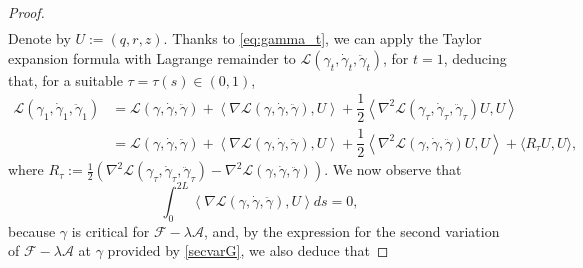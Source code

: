 \documentclass[11pt]{amsart}
\newcommand{\A}{\mathcal A}
\newcommand{\F}{\mathcal F}
\newcommand{\Lag}{\mathscr{L}}
\theoremstyle{definition}
\theoremstyle{remark}
\numberwithin{equation}{section}
\begin{document}
\begin{proof}
\begin{equation}
\begin{split}
\end{split}
\end{equation}
Denote by $U := (q,r,z)$. Thanks to \eqref{eq:gamma_t}, we can apply the Taylor expansion formula with Lagrange remainder to $\Lag(\gamma_t , \dot \gamma_t , \ddot \gamma_t)$, for $t=1$, deducing that, for a suitable $\tau = \tau(s) \in (0,1)$,
\begin{equation} \label{eq:Lag_t=1}
\begin{split}
\Lag(\gamma_1, \dot \gamma_1 , \ddot \gamma_1) & = \Lag(\gamma, \dot \gamma , \ddot \gamma) + \left \langle \nabla \Lag(\gamma, \dot \gamma , \ddot \gamma), U \right \rangle + \dfrac{1}{2} \left \langle \nabla^2 \Lag(\gamma_{\tau}, \dot \gamma_{\tau}, \ddot \gamma_{\tau}) U, U \right \rangle \\
& = \Lag(\gamma, \dot \gamma , \ddot \gamma) + \left \langle \nabla \Lag(\gamma, \dot \gamma , \ddot \gamma), U \right \rangle + \dfrac{1}{2} \left \langle \nabla^2 \Lag(\gamma, \dot \gamma, \ddot \gamma) U, U \right \rangle + \langle R_{\tau} U, U \rangle , %
\end{split}
\end{equation}
where $R_{\tau} := \frac{1}{2} \left( \nabla^2 \Lag(\gamma_{\tau}, \dot \gamma_{\tau}, \ddot \gamma_{\tau}) - \nabla^2 \Lag(\gamma, \dot \gamma, \ddot \gamma) \right)$.
We now observe that
\begin{equation} \label{eq:first_var_Lag}
\int_0^{2L} \left \langle \nabla \Lag(\gamma, \dot \gamma , \ddot \gamma), U \right \rangle ds = 0 ,
\end{equation}
because $\gamma$ is critical for $\mathcal F-\lambda  \A $, and, by the expression for the second variation of $\F-\lambda\A$ at $\gamma$ provided by \eqref{secvarG}, we also deduce that

\end{proof}
\end{document}
